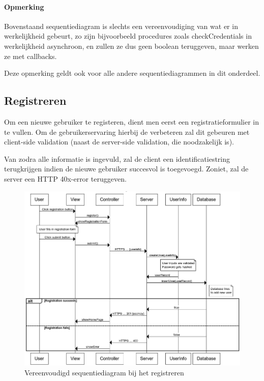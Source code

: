 \documentclass{article}
\begin{document}
\paragraph{Opmerking}

Bovenstaand sequentiediagram is slechts een vereenvoudiging van wat er in werkelijkheid gebeurt, zo zijn bijvoorbeeld procedures zoals checkCredentials in werkelijkheid asynchroon, en zullen ze dus geen boolean teruggeven, maar werken ze met callbacks.

Deze opmerking geldt ook voor alle andere sequentiediagrammen in dit onderdeel.

\subsection{Registreren}

Om een nieuwe gebruiker te registeren, dient men eerst een registratieformulier in te vullen. Om de gebruikerservaring hierbij de verbeteren zal dit gebeuren met client-side validation (naast de server-side validation, die noodzakelijk is). 

Van zodra alle informatie is ingevuld, zal de client een identificatiestring terugkrijgen indien de nieuwe gebruiker succesvol is toegevoegd. Zoniet, zal de server een HTTP 40x-error teruggeven.

\begin{figure}[!h]
\centering
 \includegraphics[width=145mm]{registration-sequence.png}
 \caption{Vereenvoudigd sequentiediagram bij het registreren}
 \label{register-sequence}
\end{figure}
\end{document}
